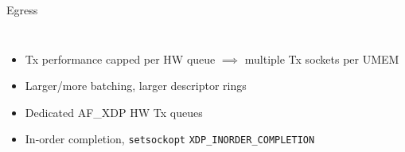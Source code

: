 \documentclass[aspectratio=169]{beamer}
\begin{document}
  \begin{frame}{Egress}
  \begin{columns}[T,onlytextwidth]
    \begin{itemize}
    \item Tx performance capped per HW queue $\implies$ multiple Tx
      sockets per UMEM
    \item Larger/more batching, larger descriptor rings
    \item Dedicated AF\_XDP HW Tx queues
    \item In-order completion, {\tt setsockopt} {\tt XDP\_INORDER\_COMPLETION}
    \end{itemize}
    \centering{}
    \end{columns}
  \end{frame}
\end{document}
